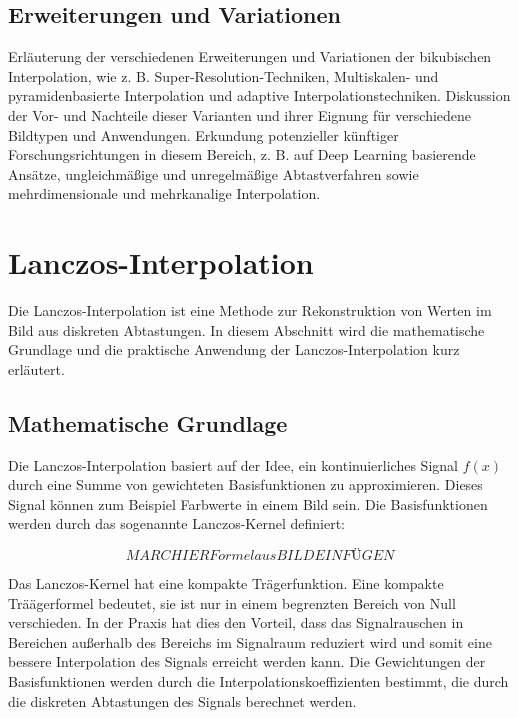     \subsection{Erweiterungen und Variationen}

    Erläuterung der verschiedenen Erweiterungen und Variationen der bikubischen Interpolation, wie z. B. Super-Resolution-Techniken, Multiskalen- und pyramidenbasierte Interpolation und adaptive Interpolationstechniken.
    Diskussion der Vor- und Nachteile dieser Varianten und ihrer Eignung für verschiedene Bildtypen und Anwendungen.
    Erkundung potenzieller künftiger Forschungsrichtungen in diesem Bereich, z. B. auf Deep Learning basierende Ansätze, ungleichmäßige und unregelmäßige Abtastverfahren sowie mehrdimensionale und mehrkanalige Interpolation.


\section{Lanczos-Interpolation}
    Die Lanczos-Interpolation ist eine Methode zur Rekonstruktion von Werten im Bild aus diskreten Abtastungen. 
    In diesem Abschnitt wird die mathematische Grundlage und die praktische Anwendung der Lanczos-Interpolation kurz erläutert.

\subsection{Mathematische Grundlage}

    Die Lanczos-Interpolation basiert auf der Idee, ein kontinuierliches Signal $f(x)$ durch eine Summe von gewichteten Basisfunktionen zu approximieren. 
    Dieses Signal können zum Beispiel Farbwerte in einem Bild sein.
    Die Basisfunktionen werden durch das sogenannte Lanczos-Kernel definiert:

\begin{equation}
MARC HIER Formel aus BILD EINFÜGEN
\end{equation}

Das Lanczos-Kernel hat eine kompakte Trägerfunktion.
Eine kompakte Träägerformel bedeutet, sie ist nur in einem begrenzten Bereich von Null verschieden. 
In der Praxis hat dies den Vorteil, dass das Signalrauschen in Bereichen außerhalb des Bereichs im Signalraum reduziert wird und somit eine bessere Interpolation des Signals erreicht werden kann.
Die Gewichtungen der Basisfunktionen werden durch die Interpolationskoeffizienten bestimmt, die durch die diskreten Abtastungen des Signals berechnet werden.


